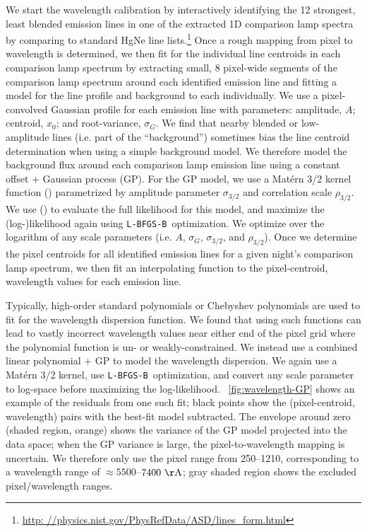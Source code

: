 \documentclass[modern, letterpaper]{aastex61}
\newcommand{\lbfgsb}{\texttt{L-BFGS-B}}
\begin{document}
We start the wavelength calibration by interactively identifying the 12
strongest, least blended emission lines in one of the extracted 1D comparison
lamp spectra by comparing to standard HgNe line lists.\footnote{\url{http:
//physics.nist.gov/PhysRefData/ASD/lines_form.html}}
Once a rough mapping from pixel to wavelength is determined, we then fit for the
individual line centroids in each comparison lamp spectrum by extracting small,
8 pixel-wide segments of the comparison lamp spectrum around each identified
emission line and fitting a model for the line profile and background to each
individually.
We use a pixel-convolved Gaussian profile for each emission line with
parameters: amplitude, $A$; centroid, $x_0$; and root-variance, $\sigma_G$.
We find that nearby blended or low-amplitude lines (i.e. part of the
``background'') sometimes bias the line centroid determination when using a
simple background model.
We therefore model the background flux around each comparison lamp emission
line using a constant offset + Gaussian process (GP).
For the GP model, we use a Mat\'ern 3/2 kernel function
(\citealt{Matern:1986,Rasmussen:2005}) parametrized by amplitude parameter
$\sigma_{3/2}$ and correlation scale $\rho_{3/2}$.
We use  (\citealt{Foreman-Mackey:2017}) to evaluate the full
likelihood for this model, and maximize the (log-)likelihood again using
\lbfgsb\ optimization.
We optimize over the logarithm of any scale parameters (i.e. $A$, $\sigma_G$,
$\sigma_{3/2}$, and $\rho_{3/2}$).
Once we determine the pixel centroids for all identified emission lines for a
given night's comparison lamp spectrum, we then fit an interpolating function
to the pixel-centroid, wavelength values for each emission line.

Typically, high-order standard polynomials or Chebyshev polynomials are used to
fit for the wavelength dispersion function.
We found that using such functions can lead to vastly incorrect wavelength
values near either end of the pixel grid where the polynomial function is
un- or weakly-constrained.
We instead use a combined linear polynomial + GP to model the wavelength
dispersion.
We again use a Mat\'ern 3/2 kernel, use \lbfgsb\ optimization, and convert any
scale parameter to log-space before maximizing the log-likelihood.
\figurename~\ref{fig:wavelength-GP} shows an example of the residuals from one
such fit; black points show the (pixel-centroid, wavelength) pairs with the
best-fit model subtracted.
The envelope around zero (shaded region, orange) shows the variance of the GP
model projected into the data space; when the GP variance is large, the
pixel-to-wavelength mapping is uncertain.
We therefore only use the pixel range from 250--1210, corresponding to a
wavelength range of $\approx 5500$--$7400~{\rm \AA}$; gray shaded region shows
the excluded pixel/wavelength ranges.
\end{document}
